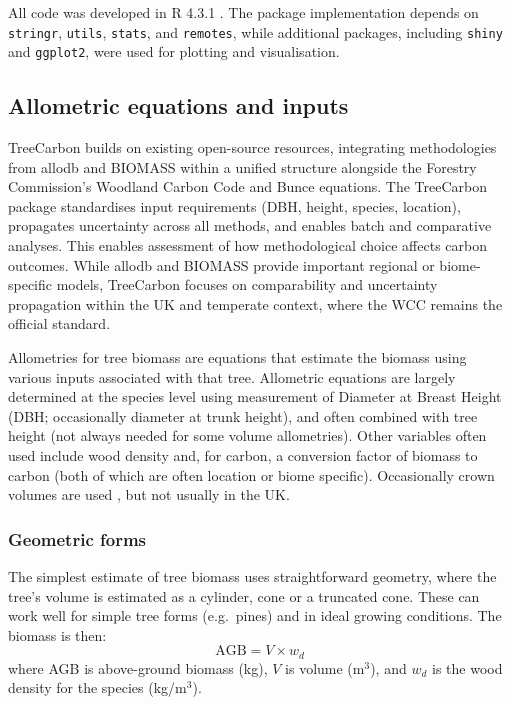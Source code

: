 \documentclass[12pt,a4paper]{article}
\begin{document}
All code was developed in R 4.3.1 \citep{RCore2023}. The package implementation depends on \texttt{stringr}, \texttt{utils}, \texttt{stats}, and \texttt{remotes}, while additional packages, including \texttt{shiny} and \texttt{ggplot2}, were used for plotting and visualisation.

\subsection{Allometric equations and inputs}

TreeCarbon builds on existing open-source resources, integrating methodologies from allodb \citep{Gonzalez-Akre2022} and BIOMASS \citep{Rejou-Mechain2017} within a unified structure alongside the Forestry Commission's Woodland Carbon Code and Bunce \citep{Bunce1968} equations. The TreeCarbon package standardises input requirements (DBH, height, species, location), propagates uncertainty across all methods, and enables batch and comparative analyses. This enables assessment of how methodological choice affects carbon outcomes. While allodb and BIOMASS provide important regional or biome-specific models, TreeCarbon focuses on comparability and uncertainty propagation within the UK and temperate context, where the WCC remains the official standard.

Allometries for tree biomass are equations that estimate the biomass using various inputs associated with that tree. Allometric equations are largely determined at the species level using measurement of Diameter at Breast Height (DBH; occasionally diameter at trunk height), and often combined with tree height (not always needed for some volume allometries). Other variables often used include wood density and, for carbon, a conversion factor of biomass to carbon (both of which are often location or biome specific). Occasionally crown volumes are used \citep{Sillett2019}, but not usually in the UK.

\subsubsection{Geometric forms}

The simplest estimate of tree biomass uses straightforward geometry, where the tree's volume is estimated as a cylinder, cone or a truncated cone. These can work well for simple tree forms (e.g.\ pines) and in ideal growing conditions. The biomass is then:
\begin{equation}
  \text{AGB} = V \times w_d
\end{equation}
where AGB is above-ground biomass (kg), $V$ is volume (m$^3$), and $w_d$ is the wood density for the species (kg/m$^3$).
\end{document}
